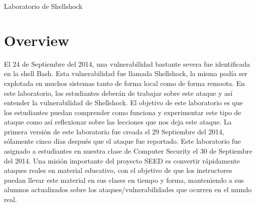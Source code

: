 
\newcommand{\commonfolder}{../../common-files}
\newcommand{\webcommon}{../Web_Common}





\newcommand{\bash}{{\tt bash}\xspace}
\newcommand{\Bash}{{\tt Bash}\xspace}




\begin{center}
{\LARGE Laboratorio de Shellshock}
\end{center}


\section{Overview}

El 24 de Septiembre del 2014, una vulnerabilidad bastante severa fue identificada en la shell Bash. Esta vulnerabilidad fue llamada Shellshock, la misma podía ser explotada en muchos sistemas tanto de forma local como de forma remoota.
En este laboratorio, los estudiantes deberán de trabajar sobre este ataque y así entender la vulnerabilidad de Shellshock. 
El objetivo de este laboratorio es que los estudiantes puedan comprender como funciona y experimentar este tipo de ataque como así reflexionar sobre las lecciones que nos deja este ataque.
La primera versión de este laboratorio fue creada el 29 Septiembre del 2014, sólamente cinco días después que el ataque fue reportado. Este laboratorio fue asignado a estudiantes en nuestra clase de Computer Security el 30 de Septiembre del 2014.
Una misión importante del proyecto SEED es convertir rápidamente ataques reales en material educativo, con el objetivo de que los instructores puedan llevar este material en sus clases en tiempo y forma, manteniendo a sus alumnos actualizados sobre los ataques/vulnerabilidades que ocurren en el mundo real. 


